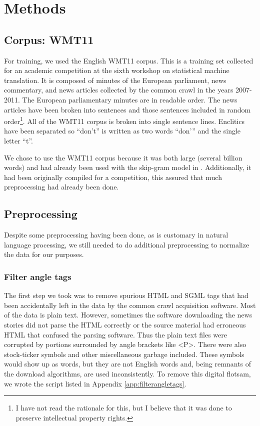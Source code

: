 \documentclass[eric_thesis.tex]{subfiles}
\begin{document}
\chapter{Methods}

\section{Corpus: WMT11}

For training, we used the English WMT11 corpus. This is a training set collected 
for an academic competition at the sixth workshop on statistical machine 
translation. It is composed of minutes of the European parliament, news 
commentary, and news articles collected by the common crawl in the years 
2007-2011. The European parliamentary minutes are in 
readable order. The news articles have been broken into sentences and those 
sentences included in random order\footnote{I have not read the rationale for 
this, but I believe that it was done to preserve intellectual property rights.}. 
All of the WMT11 corpus is broken into single sentence lines. Enclitics have 
been separated so ``don't'' is written as two words ``don'\phantom{}'' and the 
single letter ``t''.

We chose to use the WMT11 corpus because it was both large (several billion 
words) and had already been used with the skip-gram model in . Additionally, it had been originally 
compiled for a competition, this assured that much preprocessing had already 
been done.

\section{Preprocessing}

Despite some preprocessing having been done, as is customary in natural language 
processing, we still needed to do additional preprocessing to normalize the data 
for our purposes.

\subsection{Filter angle tags}

The first step we took was to remove spurious HTML and SGML tags that had been 
accidentally left in the data by the common crawl acquisition software. Most of 
the data is plain text. However, sometimes the software downloading the news 
stories did not parse the HTML correctly or the source material had erroneous 
HTML that confused the parsing software. Thus the plain text files were 
corrupted by portions surrounded by angle brackets like <P>. There were also 
stock-ticker symbols and other miscellaneous garbage included. These symbols 
would show up as words, but they are not English words and, being remnants of 
the download algorithms, are used inconsistently. To remove this digital 
flotsam, we wrote the script  listed in 
Appendix \ref{app:filterangletags}.
\end{document}
